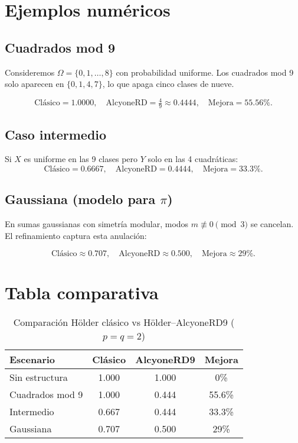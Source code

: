 \documentclass[12pt,a4paper]{article}
\theoremstyle{plain}
\begin{document}
\section{Ejemplos numéricos}
\subsection{Cuadrados mod 9}
Consideremos $\Omega = \{0,1,\dots,8\}$ con probabilidad uniforme. 
Los cuadrados mod 9 solo aparecen en $\{0,1,4,7\}$, lo que apaga cinco clases de nueve.

\[
\text{Clásico} = 1.0000, \quad
\text{AlcyoneRD} = \tfrac{4}{9} \approx 0.4444, \quad
\text{Mejora} = 55.56\%.
\]

\subsection{Caso intermedio}
Si $X$ es uniforme en las 9 clases pero $Y$ solo en las 4 cuadráticas:
\[
\text{Clásico} = 0.6667, \quad
\text{AlcyoneRD} = 0.4444, \quad
\text{Mejora} = 33.3\%.
\]

\subsection{Gaussiana (modelo para $\pi$)}
En sumas gaussianas con simetría modular, modos $m\not\equiv 0\pmod{3}$ se cancelan. 
El refinamiento captura esta anulación:

\[
\text{Clásico} \approx 0.707, \quad
\text{AlcyoneRD} \approx 0.500, \quad
\text{Mejora} \approx 29\%.
\]

\section{Tabla comparativa}
\begin{table}[h]
\centering
\caption{Comparación Hölder clásico vs Hölder–AlcyoneRD9 ($p=q=2$)}
\begin{tabular}{lccc}
\toprule
Escenario & Clásico & AlcyoneRD9 & Mejora \\
\midrule
Sin estructura & 1.000 & 1.000 & 0\% \\
Cuadrados mod 9 & 1.000 & 0.444 & 55.6\% \\
Intermedio & 0.667 & 0.444 & 33.3\% \\
Gaussiana & 0.707 & 0.500 & 29\% \\
\bottomrule
\end{tabular}
\end{table}
\end{document}
